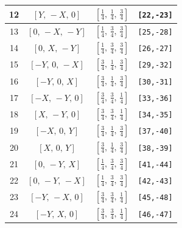 \documentclass[fleqn,8pt]{jsarticle}
\begin{document}
\begin{longtable}{cccc}
12 & $\left[ Y,\, - X,\, 0 \right]$ & $\left[ \frac{1}{4},\, \frac{1}{4},\, \frac{3}{4} \right]$ & {\tt [22,-23]} \\ \hline
13 & $\left[ 0,\, - X,\, - Y \right]$ & $\left[ \frac{1}{4},\, \frac{3}{4},\, \frac{3}{4} \right]$ & {\tt [25,-28]} \\ \hline
14 & $\left[ 0,\, X,\, - Y \right]$ & $\left[ \frac{1}{4},\, \frac{3}{4},\, \frac{3}{4} \right]$ & {\tt [26,-27]} \\ \hline
15 & $\left[ - Y,\, 0,\, - X \right]$ & $\left[ \frac{3}{4},\, \frac{1}{4},\, \frac{3}{4} \right]$ & {\tt [29,-32]} \\ \hline
16 & $\left[ - Y,\, 0,\, X \right]$ & $\left[ \frac{3}{4},\, \frac{1}{4},\, \frac{3}{4} \right]$ & {\tt [30,-31]} \\ \hline
17 & $\left[ - X,\, - Y,\, 0 \right]$ & $\left[ \frac{3}{4},\, \frac{3}{4},\, \frac{1}{4} \right]$ & {\tt [33,-36]} \\ \hline
18 & $\left[ X,\, - Y,\, 0 \right]$ & $\left[ \frac{3}{4},\, \frac{3}{4},\, \frac{1}{4} \right]$ & {\tt [34,-35]} \\ \hline
19 & $\left[ - X,\, 0,\, Y \right]$ & $\left[ \frac{3}{4},\, \frac{1}{4},\, \frac{3}{4} \right]$ & {\tt [37,-40]} \\ \hline
20 & $\left[ X,\, 0,\, Y \right]$ & $\left[ \frac{3}{4},\, \frac{1}{4},\, \frac{3}{4} \right]$ & {\tt [38,-39]} \\ \hline
21 & $\left[ 0,\, - Y,\, X \right]$ & $\left[ \frac{1}{4},\, \frac{3}{4},\, \frac{3}{4} \right]$ & {\tt [41,-44]} \\ \hline
22 & $\left[ 0,\, - Y,\, - X \right]$ & $\left[ \frac{1}{4},\, \frac{3}{4},\, \frac{3}{4} \right]$ & {\tt [42,-43]} \\ \hline
23 & $\left[ - Y,\, - X,\, 0 \right]$ & $\left[ \frac{3}{4},\, \frac{3}{4},\, \frac{1}{4} \right]$ & {\tt [45,-48]} \\ \hline
24 & $\left[ - Y,\, X,\, 0 \right]$ & $\left[ \frac{3}{4},\, \frac{3}{4},\, \frac{1}{4} \right]$ & {\tt [46,-47]} \\
\end{longtable}
\renewcommand{\arraystretch}{1.2}
\end{document}
